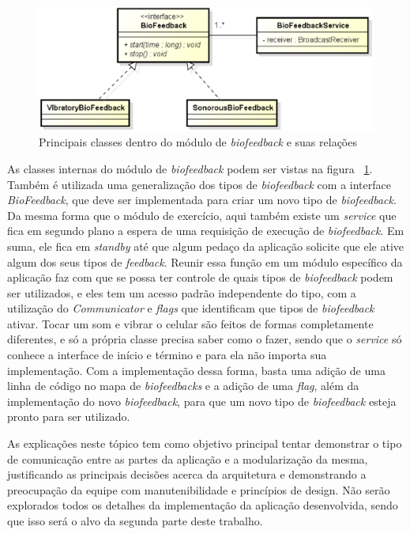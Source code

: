 \begin{figure}[!htb]
\centering
\includegraphics [keepaspectratio=true,scale=0.60]{figuras/diagramaBioFeedback.eps}
\caption{Principais classes dentro do módulo de \textit{biofeedback} e suas relações}
\label{diagramaBioFeedback}
\end{figure}

As classes internas do módulo de \textit{biofeedback} podem ser vistas na figura ~\ref{diagramaBioFeedback}. Também é utilizada uma generalização dos tipos de \textit{biofeedback} com a interface \textit{BioFeedback}, que deve ser implementada para criar um novo tipo de \textit{biofeedback}. Da mesma forma que o módulo de exercício, aqui também existe um \textit{service} que fica em segundo plano a espera de uma requisição de execução de \textit{biofeedback}. Em suma, ele fica em \textit{standby} até que algum pedaço da aplicação solicite que ele ative algum dos seus tipos de \textit{feedback}. Reunir essa função em um módulo específico da aplicação faz com que se possa ter controle de quais tipos de \textit{biofeedback} podem ser utilizados, e eles tem um acesso padrão independente do tipo, com a utilização do \textit{Communicator} e \textit{flags} que identificam que tipos de \textit{biofeedback} ativar. Tocar um som e vibrar o celular são feitos de formas completamente diferentes, e só a própria classe precisa saber como o fazer, sendo que o \textit{service} só conhece a interface de início e término e para ela não importa sua implementação. Com a implementação dessa forma, basta uma adição de uma linha de código no mapa de \textit{biofeedbacks} e a adição de uma \textit{flag}, além da implementação do novo \textit{biofeedback}, para que um novo tipo de \textit{biofeedback} esteja pronto para ser utilizado.

As explicações neste tópico tem como objetivo principal tentar demonstrar o tipo de comunicação entre as partes da aplicação e a modularização da mesma, justificando as principais decisões acerca da arquitetura e demonstrando a preocupação da equipe com manutenibilidade e princípios de design. Não serão explorados todos os detalhes da implementação da aplicação desenvolvida, sendo que isso será o alvo da segunda parte deste trabalho.